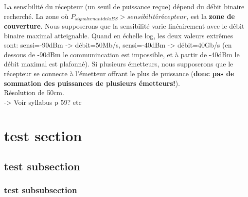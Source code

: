 La sensibilité du récepteur (un seuil de puissance reçue) dépend du débit binaire recherché. La zone où $P_{signal venant de la BS} > sensibilité récepteur$, est la \textbf{zone de couverture}. Nous supposerons que la sensibilité varie linéairement avec le débit binaire maximal atteignable. Quand en échelle log, les deux valeurs extrêmes sont: sensi=-90dBm -> débit=50Mb/s, sensi=-40dBm -> débit=40Gb/s (en dessous de -90dBm le communincation est impossible, et à partir de -40dBm le débit maximal est plafonné). Si plusieurs émetteurs, nous supposerons que le récepteur se connecte à l'émetteur offrant le plus de puissance (\textbf{donc pas de sommation des puissances de plusieurs émetteurs!}).\\

Résolution de 50cm.\\



-> Voir syllabus p 59? etc\\

\section{test section}
\subsection{test subsection}
\subsubsection{test subsubsection}
